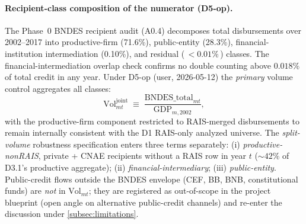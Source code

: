 \documentclass{article}
\newcommand{\Vol}{\mathrm{Vol}}
\theoremstyle{plain}
\theoremstyle{definition}
\theoremstyle{remark}
\begin{document}
\paragraph{Recipient-class composition of the numerator (D5-op).}
The Phase~0 BNDES recipient audit (A0.4) decomposes total disbursements over
2002--2017 into productive-firm (71.6\%), public-entity (28.3\%),
financial-institution intermediation (0.10\%), and residual (\,$<0.01\%$\,)
classes. The financial-intermediation overlap check confirms no double counting
above $0.018\%$ of total credit in any year. Under D5-op (user, 2026-05-12) the
\emph{primary} volume control aggregates all classes:
\begin{equation}\label{eq:vol-joint}
  \Vol^{\mathrm{joint}}_{mt}
  \;\equiv\;
  \frac{\mathrm{BNDES\_total}_{mt}}{\mathrm{GDP}_{m,2002}},
\end{equation}
with the productive-firm component restricted to RAIS-merged disbursements
to remain internally consistent with the D1 RAIS-only analyzed universe. The
\emph{split-volume} robustness specification enters three terms separately:
(i) \emph{productive-nonRAIS}, private + CNAE recipients without a RAIS row
in year $t$ ($\sim 42\%$ of D3.1's productive aggregate); (ii)
\emph{financial-intermediary}; (iii) \emph{public-entity}. Public-credit
flows outside the BNDES envelope (CEF, BB, BNB, constitutional funds) are
\emph{not} in $\Vol_{mt}$; they are registered as out-of-scope in the
project blueprint (open angle on alternative public-credit channels) and
re-enter the discussion under \autoref{subsec:limitations}.
\end{document}
